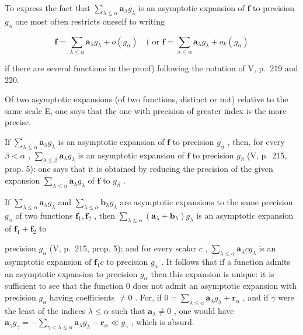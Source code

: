 To express the fact that \(\sum_{\lambda \leqslant \alpha} \mathbf{a}_{\lambda} g_{\lambda}\) is an asymptotic expansion of \(\mathbf{f}\) to precision \(g_{\alpha}\) one most often restricts oneself to writing

\[
\mathbf {f} = \sum_ {\lambda \leqslant \alpha} \mathbf {a} _ {\lambda} g _ {\lambda} + o (g _ {\alpha}) \quad (\text { or } \mathbf {f} = \sum_ {\lambda \leqslant \alpha} \mathbf {a} _ {\lambda} g _ {\lambda} + o _ {k} (g _ {\alpha})
\]

if there are several functions in the proof) following the notation of V, p.~219 and 220.

Of two asymptotic expansions (of two functions, distinct or not) relative to the same scale E, one says that the one with precision of greater index is the more precise.

If \(\sum_{\lambda \leqslant \alpha} \mathbf{a}_{\lambda} g_{\lambda}\) is an asymptotic expansion of \(\mathbf{f}\) to precision \(g_{\alpha}\) , then, for every \(\beta < \alpha\) , \(\sum_{\lambda \leqslant \beta} \mathbf{a}_{\lambda} g_{\lambda}\) is an asymptotic expansion of \(\mathbf{f}\) to precision \(g_{\beta}\) (V, p.~215, prop. 5): one says that it is obtained by reducing the precision of the given expansion \(\sum_{\lambda \leqslant \alpha} \mathbf{a}_{\lambda} g_{\lambda}\) of \(\mathbf{f}\) to \(g_{\beta}\) .

If \(\sum_{\lambda \leqslant \alpha} \mathbf{a}_{\lambda} g_{\lambda}\) and \(\sum_{\lambda \leqslant \alpha} \mathbf{b}_{\lambda} g_{\lambda}\) are asymptotic expansions to the same precision \(g_{\alpha}\) of two functions \(\mathbf{f}_1, \mathbf{f}_2\) , then \(\sum_{\lambda \leqslant \alpha} (\mathbf{a}_{\lambda} + \mathbf{b}_{\lambda}) g_{\lambda}\) is an asymptotic expansion of \(\mathbf{f}_1 + \mathbf{f}_2\) to

precision \(g_{\alpha}\) (V, p.~215, prop. 5); and for every scalar \(c\) , \(\sum_{\lambda \leqslant \alpha} \mathbf{a}_{\lambda}cg_{\lambda}\) is an asymptotic expansion of \(\mathbf{f}_1c\) to precision \(g_{\alpha}\) . It follows that if a function admits an asymptotic expansion to precision \(g_{\alpha}\) then this expansion is unique: it is sufficient to see that the function 0 does not admit an asymptotic expansion with precision \(g_{\alpha}\) having coefficients \(\neq 0\) . For, if \(0 = \sum_{\lambda \leqslant \alpha} \mathbf{a}_{\lambda}g_{\lambda} + \mathbf{r}_{\alpha}\) , and if \(\gamma\) were the least of the indices \(\lambda \leqslant \alpha\) such that \(\mathbf{a}_{\lambda} \neq 0\) , one would have \(\mathbf{a}_{\gamma}g_{\gamma} = -\sum_{\gamma < \lambda \leqslant \alpha} \mathbf{a}_{\lambda}g_{\lambda} - \mathbf{r}_{\alpha} \ll g_{\gamma}\) , which is absurd.

